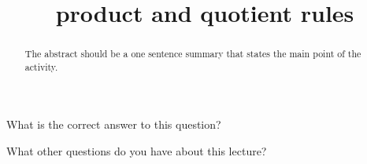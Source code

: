 \documentclass{ximera}
\title{product and quotient rules}
\begin{document}
\begin{abstract}
  The abstract should be a one sentence summary that states the main point of the activity.
\end{abstract}

\maketitle

\begin{question}
  What is the correct answer to this question?

  \begin{solution}
    \begin{multiple-choice}
    \end{multiple-choice}  
  \end{solution}
\end{question}

What other questions do you have about this lecture?
\begin{free-response}
\end{free-response}
\end{document}
